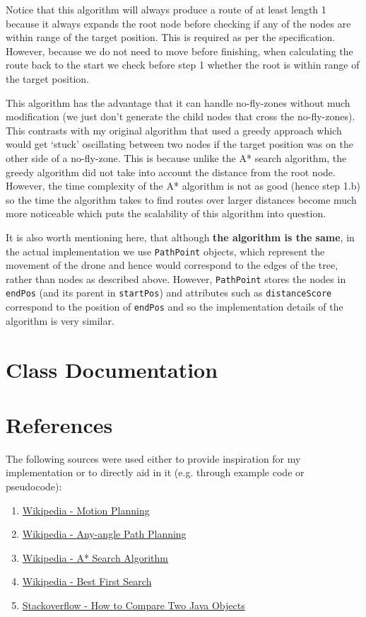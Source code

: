 \documentclass[11pt]{article}
\begin{document}
Notice that this algorithm will always produce a route of at least length 1 because it always expands the root node before checking if any of the nodes are within range of the target position. This is required as per the specification. However, because we do not need to move before finishing, when calculating the route back to the start we check before step 1 whether the root is within range of the target position.

This algorithm has the advantage that it can handle no-fly-zones without much modification (we just don't generate the child nodes that cross the no-fly-zones). This contrasts with my original algorithm that used a greedy approach which would get `stuck' oscillating between two nodes if the target position was on the other side of a no-fly-zone. This is because unlike the A* search algorithm, the greedy algorithm did not take into account the distance from the root node. However, the time complexity of the A* algorithm is not as good (hence step 1.b) so the time the algorithm takes to find routes over larger distances become much more noticeable which puts the scalability of this algorithm into question.

It is also worth mentioning here, that although \textbf{the algorithm is the same}, in the actual implementation we use \texttt{PathPoint} objects, which represent the movement of the drone and hence would correspond to the edges of the tree, rather than nodes as described above. However, \texttt{PathPoint} stores the nodes in \texttt{endPos} (and its parent in \texttt{startPos}) and attributes such as \texttt{distanceScore} correspond to the position of \texttt{endPos} and so the implementation details of the algorithm is very similar.

\newpage

\section{Class Documentation}


\newpage

\section{References}
The following sources were used either to provide inspiration for my implementation or to directly aid in it (e.g. through example code or pseudocode):
\begin{enumerate}
    \item \href{https://en.wikipedia.org/wiki/Motion_planning#Grid-based_search}{Wikipedia - Motion Planning}
    \item \href{https://en.wikipedia.org/wiki/Any-angle_path_planning}{Wikipedia - Any-angle Path Planning}
    \item \href{https://en.wikipedia.org/wiki/A*_search_algorithm#}{Wikipedia - A* Search Algorithm}
    \item \href{https://en.wikipedia.org/wiki/Best-first_search}{Wikipedia - Best First Search}
    \item \href{https://stackoverflow.com/questions/16069106/how-to-compare-two-java-objects}{Stackoverflow - How to Compare Two Java Objects}
\end{enumerate}
\end{document}
